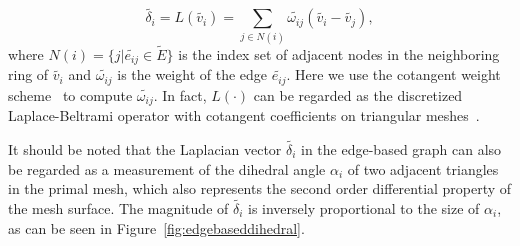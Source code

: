 \begin{equation}
\label{eq:edgelaplacian}
\tilde{\delta_i}=L(\tilde{v_i})=\sum\limits_{j\in N(i)}{\tilde{\omega_{ij}} (\tilde{v_i}-\tilde{v_j})},
\end{equation}
where $N(i)=\{j|\tilde{e_{ij}}\in \tilde{E}\}$ is the  index set of
adjacent nodes in the neighboring ring of $\tilde{v_i}$ and
$\tilde{\omega_{ij}}$ is the weight of the edge $\tilde{e_{ij}}$.
Here we use the cotangent weight scheme~\cite{MDSB02} to compute
$\tilde{\omega_{ij}}$. In fact, $L(\cdot)$ can be regarded as the
discretized Laplace-Beltrami operator with cotangent coefficients on
triangular meshes~\cite{BS08}.

It should be noted that the Laplacian  vector $\tilde{\delta_i}$ in
the edge-based graph can also be regarded as a measurement of the
dihedral angle $\alpha_i$ of two adjacent triangles in the primal
mesh, which also represents the second order differential property
of the mesh surface. The magnitude of $\tilde{\delta_i}$ is
inversely proportional to the size of $\alpha_i$, as can be seen in
Figure~\ref{fig:edgebaseddihedral}.

